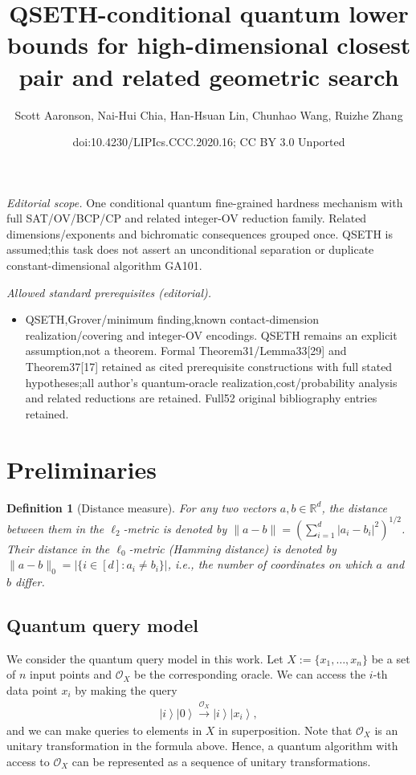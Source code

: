 \documentclass[10pt,a4paper]{article}
\title{QSETH-conditional quantum lower bounds for high-dimensional closest pair and related geometric search}
\author{Scott Aaronson, Nai-Hui Chia, Han-Hsuan Lin, Chunhao Wang, Ruizhe Zhang}
\date{doi:10.4230/LIPIcs.CCC.2020.16; CC BY 3.0 Unported}
\newtheorem{definition}[theorem]{Definition}
\newcommand{\R}{\mathbb{R}}
\newcommand{\ket}[1]{\left| #1 \right\rangle}
\newcommand{\ora}{\mathcal{O}}
\begin{document}
\maketitle
\noindent\textit{Editorial scope.} One conditional quantum fine-grained hardness mechanism with full SAT/OV/BCP/CP and related integer-OV reduction family. Related dimensions/exponents and bichromatic consequences grouped once. QSETH is assumed;this task does not assert an unconditional separation or duplicate constant-dimensional algorithm GA101.\par\medskip
\noindent\textit{Allowed standard prerequisites (editorial).}\begin{itemize}
\item QSETH,Grover/minimum finding,known contact-dimension realization/covering and integer-OV encodings. QSETH remains an explicit assumption,not a theorem. Formal Theorem31/Lemma33[29] and Theorem37[17] retained as cited prerequisite constructions with full stated hypotheses;all author's quantum-oracle realization,cost/probability analysis and related reductions are retained. Full52 original bibliography entries retained.
\end{itemize}\medskip
\setcounter{section}{1}
\setcounter{theorem}{5}
\section{Preliminaries}
\begin{definition}[Distance measure]
For any two vectors $a,b\in\R^d$, the distance between them in the $\ell_2$-metric is denoted by $\|a-b\|=\left(\sum_{i=1}^d|a_i-b_i|^2\right)^{1/2}$.
Their distance in the $\ell_0$-metric (Hamming distance) is denoted by 
$\|a-b\|_0=|\{i\in[d]:a_i\neq b_i\}|$, i.e.,
the number of coordinates on which $a$ and $b$ differ.
\end{definition}


\subsection{Quantum query model}

We consider the quantum query model in this work. Let $X:=\{x_1,\dots,x_n\}$ be a set of $n$ input points and $\ora_X$ be the corresponding oracle. We can access the $i$-th data point $x_i$ by making the query 
\begin{align}
    \ket{i}\ket{0} \xrightarrow{\ora_X} \ket{i}\ket{x_i},  
\end{align}
and we can make queries to elements in $X$ in superposition. Note that $\ora_X$ is an unitary transformation in the formula above. Hence, a quantum algorithm with access to $\ora_X$ can be represented as a sequence of unitary transformations. 
\end{document}
